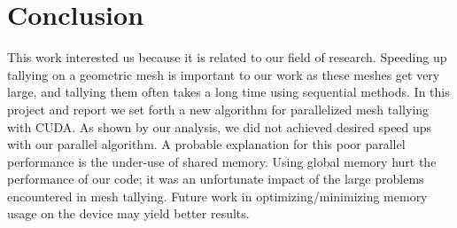\section{Conclusion}
This work interested us because it is related to our field of 
research. Speeding up tallying on a geometric mesh is important to our work 
as these meshes get very large, and tallying them often takes a long time
using sequential methods. In this project and report we set
forth a new algorithm for parallelized mesh tallying with CUDA. 
As shown by our analysis, we did not achieved desired speed ups with our
parallel algorithm. A probable explanation for this poor parallel performance is the under-use of
shared memory. Using global memory hurt the performance of our code;
it was an unfortunate impact of the large problems encountered in mesh tallying.
Future work in optimizing/minimizing memory usage on the device may yield
better results.
